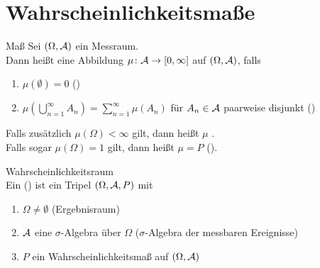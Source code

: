 \section{%
    Wahrscheinlichkeitsmaße%
}

\begin{Def}{Maß}
    Sei $(\Omega, \mathcal{A})$ ein Messraum.\\
    Dann heißt eine Abbildung $\mu\colon \mathcal{A} \rightarrow [0, \infty]$ 
    auf $(\Omega, \mathcal{A})$, falls
    \begin{enumerate}
        \item
        $\mu(\emptyset) = 0$ ()

        \item
        $\mu(\bigcup_{n=1}^\infty A_n) = \sum_{n=1}^\infty \mu(A_n)$ für
        $A_n \in \mathcal{A}$ paarweise disjunkt ()
    \end{enumerate}
    Falls zusätzlich $\mu(\Omega) < \infty$ gilt, dann heißt $\mu$ .\\
    Falls sogar $\mu(\Omega) = 1$ gilt, dann heißt $\mu = P$ 
    ().
\end{Def}

\begin{Def}{Wahrscheinlichkeitsraum}\\
    Ein  () ist ein Tripel $(\Omega, \mathcal{A}, P)$ mit
    \begin{enumerate}
        \item
        $\Omega \not= \emptyset$ (Ergebnisraum)

        \item
        $\mathcal{A}$ eine $\sigma$-Algebra über $\Omega$ ($\sigma$-Algebra der messbaren Ereignisse)

        \item
        $P$ ein Wahrscheinlichkeitsmaß auf $(\Omega, \mathcal{A})$
    \end{enumerate}
\end{Def}

\linie
\pagebreak

